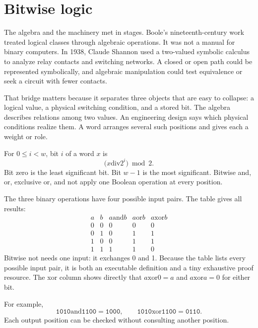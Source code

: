 \section{Bitwise logic}

The algebra and the machinery met in stages. Boole's nineteenth-century work
treated logical classes through algebraic operations. It was not a manual for
binary computers. In 1938, Claude Shannon used a two-valued symbolic calculus
to analyze relay contacts and switching networks. A closed or open path could
be represented symbolically, and algebraic manipulation could test
equivalence or seek a circuit with fewer contacts.
\autocite{boole1854laws,shannon1938symbolic}

That bridge matters because it separates three objects that are easy to
collapse: a logical value, a physical switching condition, and a stored bit.
The algebra describes relations among two values. An engineering design says
which physical conditions realize them. A word arranges several such
positions and gives each a weight or role.

For \(0 \leq i < w\), bit \(i\) of a word \(x\) is
\[
  \bigl(x \mathbin{\mathrm{div}} 2^i\bigr) \bmod 2.
\]
Bit zero is the least significant bit. Bit \(w-1\) is the most significant.
Bitwise and, or, exclusive or, and not apply one Boolean operation at every
position.

The three binary operations have four possible input pairs. The table gives
all results:
\[
\begin{array}{cc|ccc}
a & b & a\mathbin{\mathrm{and}}b & a\mathbin{\mathrm{or}}b &
 a\mathbin{\mathrm{xor}}b \\
\hline
0&0&0&0&0\\
0&1&0&1&1\\
1&0&0&1&1\\
1&1&1&1&0
\end{array}
\]
Bitwise not needs one input: it exchanges 0 and 1. Because the table lists
every possible input pair, it is both an executable definition and a tiny
exhaustive proof resource. The xor column shows directly that
\(a\mathbin{\mathrm{xor}}0=a\) and
\(a\mathbin{\mathrm{xor}}a=0\) for either bit.

For example,
\[
  \mathtt{1010}\mathbin{\mathrm{and}}\mathtt{1100}=\mathtt{1000},
  \qquad
  \mathtt{1010}\mathbin{\mathrm{xor}}\mathtt{1100}=\mathtt{0110}.
\]
Each output position can be checked without consulting another position.

